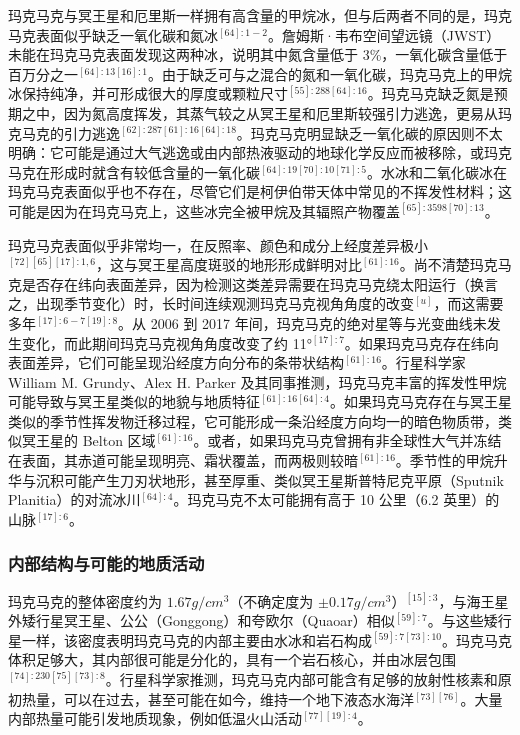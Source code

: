 玛克马克与冥王星和厄里斯一样拥有高含量的甲烷冰，但与后两者不同的是，玛克马克表面似乎缺乏一氧化碳和氮冰$^{[64]:1-2}$。詹姆斯·韦布空间望远镜（JWST）未能在玛克马克表面发现这两种冰，说明其中氮含量低于 3\%，一氧化碳含量低于百万分之一$^{[64]:13[16]:1}$。由于缺乏可与之混合的氮和一氧化碳，玛克马克上的甲烷冰保持纯净，并可形成很大的厚度或颗粒尺寸$^{[55]:288[64]:16}$。玛克马克缺乏氮是预期之中，因为氮高度挥发，其蒸气较之从冥王星和厄里斯较强引力逃逸，更易从玛克马克的引力逃逸$^{[62]:287[61]:16[64]:18}$。玛克马克明显缺乏一氧化碳的原因则不太明确：它可能是通过大气逃逸或由内部热液驱动的地球化学反应而被移除，或玛克马克在形成时就含有较低含量的一氧化碳$^{[64]:19[70]:10[71]:5}$。水冰和二氧化碳冰在玛克马克表面似乎也不存在，尽管它们是柯伊伯带天体中常见的不挥发性材料；这可能是因为在玛克马克上，这些冰完全被甲烷及其辐照产物覆盖$^{[65]:3598[70]:13}$。

玛克马克表面似乎非常均一，在反照率、颜色和成分上经度差异极小$^{[72][65][17]:1,6}$，这与冥王星高度斑驳的地形形成鲜明对比$^{[61]:16}$。尚不清楚玛克马克是否存在纬向表面差异，因为检测这类差异需要在玛克马克绕太阳运行（换言之，出现季节变化）时，长时间连续观测玛克马克视角角度的改变$^{[u]}$，而这需要多年$^{[17]:6-7[19]:8}$。从 2006 到 2017 年间，玛克马克的绝对星等与光变曲线未发生变化，而此期间玛克马克视角角度改变了约 11°$^{[17]:7}$。如果玛克马克存在纬向表面差异，它们可能呈现沿经度方向分布的条带状结构$^{[61]:16}$。行星科学家 William M. Grundy、Alex H. Parker 及其同事推测，玛克马克丰富的挥发性甲烷可能导致与冥王星类似的地貌与地质特征$^{[61]:16[64]:4}$。如果玛克马克存在与冥王星类似的季节性挥发物迁移过程，它可能形成一条沿经度方向均一的暗色物质带，类似冥王星的 Belton 区域$^{[61]:16}$。或者，如果玛克马克曾拥有非全球性大气并冻结在表面，其赤道可能呈现明亮、霜状覆盖，而两极则较暗$^{[61]:16}$。季节性的甲烷升华与沉积可能产生刀刃状地形，甚至厚重、类似冥王星斯普特尼克平原（Sputnik Planitia）的对流冰川$^{[64]:4}$。玛克马克不太可能拥有高于 10 公里（6.2 英里）的山脉$^{[17]:6}$。
\subsubsection{内部结构与可能的地质活动}
玛克马克的整体密度约为 $1.67 g/cm^3$（不确定度为 $\pm0.17 g/cm^3$）$^{[15]:3}$，与海王星外矮行星冥王星、公公（Gonggong）和夸欧尔（Quaoar）相似$^{[59]:7}$。与这些矮行星一样，该密度表明玛克马克的内部主要由水冰和岩石构成$^{[59]:7[73]:10}$。玛克马克体积足够大，其内部很可能是分化的，具有一个岩石核心，并由冰层包围$^{[74]:230[75][73]:8}$。行星科学家推测，玛克马克内部可能含有足够的放射性核素和原初热量，可以在过去，甚至可能在如今，维持一个地下液态水海洋$^{[73][76]}$。大量内部热量可能引发地质现象，例如低温火山活动$^{[77][19]:4}$。

